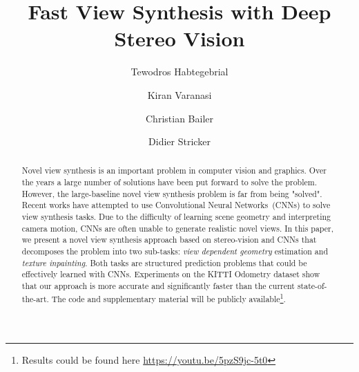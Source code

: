 \documentclass[runningheads]{llncs}
\begin{document}
\def\ECCV18SubNumber{xxxx}  %

\title{Fast View Synthesis with Deep Stereo Vision} %



\author{
Tewodros Habtegebrial  \and 
Kiran Varanasi  \and 
Christian Bailer  \and 
Didier Stricker 
}



\maketitle

\begin{abstract}

Novel view synthesis is an important problem in computer vision and graphics. Over the years a large number of solutions have been put forward to solve the problem. However, the large-baseline novel view synthesis problem is far from being "solved". Recent works have attempted to use Convolutional Neural Networks~(CNNs) to solve view synthesis tasks. Due to the difficulty of learning scene geometry and interpreting camera motion, CNNs are often unable to generate realistic novel views. In this paper, we present a novel view synthesis approach based on stereo-vision and CNNs that decomposes the problem into two sub-tasks: \textit{view dependent geometry} estimation and \textit{texture inpainting}. Both tasks are structured prediction problems that could be effectively learned with CNNs. Experiments on the KITTI Odometry dataset show that our approach is more accurate and significantly faster than the current state-of-the-art. The code and supplementary material will be publicly available\footnote{Results could be found here \url{https://youtu.be/5pzS9jc-5t0}}.

\end{abstract}
\end{document}
